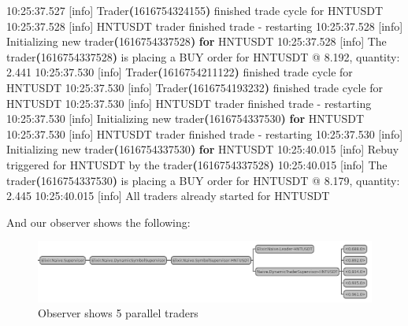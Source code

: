 \documentclass[
]{book}
\newenvironment{Shaded}{\begin{snugshade}}{\end{snugshade}}
\newcommand{\AttributeTok}[1]{\textcolor[rgb]{0.77,0.63,0.00}{#1}}
\newcommand{\ControlFlowTok}[1]{\textcolor[rgb]{0.13,0.29,0.53}{\textbf{#1}}}
\newcommand{\ErrorTok}[1]{\textcolor[rgb]{0.64,0.00,0.00}{\textbf{#1}}}
\newcommand{\ExtensionTok}[1]{#1}
\newcommand{\KeywordTok}[1]{\textcolor[rgb]{0.13,0.29,0.53}{\textbf{#1}}}
\newcommand{\NormalTok}[1]{#1}
\begin{document}
\begin{Shaded}
\begin{Highlighting}[]
\ExtensionTok{10:25:37.527}\NormalTok{ [info]  Trader}\ErrorTok{(}\ExtensionTok{1616754324155}\KeywordTok{)} \ExtensionTok{finished}\NormalTok{ trade cycle for HNTUSDT}
\ExtensionTok{10:25:37.528}\NormalTok{ [info]  HNTUSDT trader finished trade }\AttributeTok{{-}}\NormalTok{ restarting}
\ExtensionTok{10:25:37.528}\NormalTok{ [info]  Initializing new trader}\ErrorTok{(}\ExtensionTok{1616754337528}\KeywordTok{)} \ControlFlowTok{for}\NormalTok{ HNTUSDT}
\ExtensionTok{10:25:37.528}\NormalTok{ [info]  The trader}\ErrorTok{(}\ExtensionTok{1616754337528}\KeywordTok{)} \ExtensionTok{is}\NormalTok{ placing a BUY order for HNTUSDT @ 8.192, quantity: 2.441}
\ExtensionTok{10:25:37.530}\NormalTok{ [info]  Trader}\ErrorTok{(}\ExtensionTok{1616754211122}\KeywordTok{)} \ExtensionTok{finished}\NormalTok{ trade cycle for HNTUSDT}
\ExtensionTok{10:25:37.530}\NormalTok{ [info]  Trader}\ErrorTok{(}\ExtensionTok{1616754193232}\KeywordTok{)} \ExtensionTok{finished}\NormalTok{ trade cycle for HNTUSDT}
\ExtensionTok{10:25:37.530}\NormalTok{ [info]  HNTUSDT trader finished trade }\AttributeTok{{-}}\NormalTok{ restarting}
\ExtensionTok{10:25:37.530}\NormalTok{ [info]  Initializing new trader}\ErrorTok{(}\ExtensionTok{1616754337530}\KeywordTok{)} \ControlFlowTok{for}\NormalTok{ HNTUSDT}
\ExtensionTok{10:25:37.530}\NormalTok{ [info]  HNTUSDT trader finished trade }\AttributeTok{{-}}\NormalTok{ restarting}
\ExtensionTok{10:25:37.530}\NormalTok{ [info]  Initializing new trader}\ErrorTok{(}\ExtensionTok{1616754337530}\KeywordTok{)} \ControlFlowTok{for}\NormalTok{ HNTUSDT}
\ExtensionTok{10:25:40.015}\NormalTok{ [info]  Rebuy triggered for HNTUSDT by the trader}\ErrorTok{(}\ExtensionTok{1616754337528}\KeywordTok{)}
\ExtensionTok{10:25:40.015}\NormalTok{ [info]  The trader}\ErrorTok{(}\ExtensionTok{1616754337530}\KeywordTok{)} \ExtensionTok{is}\NormalTok{ placing a BUY order for HNTUSDT @ 8.179, quantity: 2.445}
\ExtensionTok{10:25:40.015}\NormalTok{ [info]  All traders already started for HNTUSDT}
\end{Highlighting}
\end{Shaded}

And our observer shows the following:

\begin{figure}
\centering
\includegraphics{images/chapter_09_supervision_tree.png}
\caption{Observer shows 5 parallel traders}
\end{figure}
\end{document}
